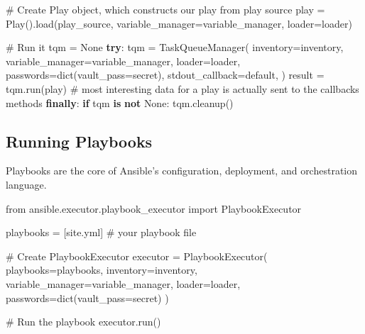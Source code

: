 \documentclass[
  letterpaper,
  DIV=11,
  numbers=noendperiod]{scrreprt}
\newenvironment{Shaded}{\begin{snugshade}}{\end{snugshade}}
\newcommand{\BuiltInTok}[1]{\textcolor[rgb]{0.00,0.23,0.31}{#1}}
\newcommand{\CommentTok}[1]{\textcolor[rgb]{0.37,0.37,0.37}{#1}}
\newcommand{\ControlFlowTok}[1]{\textcolor[rgb]{0.00,0.23,0.31}{\textbf{#1}}}
\newcommand{\ImportTok}[1]{\textcolor[rgb]{0.00,0.46,0.62}{#1}}
\newcommand{\KeywordTok}[1]{\textcolor[rgb]{0.00,0.23,0.31}{\textbf{#1}}}
\newcommand{\NormalTok}[1]{\textcolor[rgb]{0.00,0.23,0.31}{#1}}
\newcommand{\OperatorTok}[1]{\textcolor[rgb]{0.37,0.37,0.37}{#1}}
\newcommand{\StringTok}[1]{\textcolor[rgb]{0.13,0.47,0.30}{#1}}
\newcommand{\VariableTok}[1]{\textcolor[rgb]{0.07,0.07,0.07}{#1}}
\begin{document}
\begin{Shaded}
\begin{Highlighting}[]
\CommentTok{\# Create Play object, which constructs our play from play source}
\NormalTok{play }\OperatorTok{=}\NormalTok{ Play().load(play\_source, variable\_manager}\OperatorTok{=}\NormalTok{variable\_manager, loader}\OperatorTok{=}\NormalTok{loader)}

\CommentTok{\# Run it}
\NormalTok{tqm }\OperatorTok{=} \VariableTok{None}
\ControlFlowTok{try}\NormalTok{:}
\NormalTok{    tqm }\OperatorTok{=}\NormalTok{ TaskQueueManager(}
\NormalTok{              inventory}\OperatorTok{=}\NormalTok{inventory,}
\NormalTok{              variable\_manager}\OperatorTok{=}\NormalTok{variable\_manager,}
\NormalTok{              loader}\OperatorTok{=}\NormalTok{loader,}
\NormalTok{              passwords}\OperatorTok{=}\BuiltInTok{dict}\NormalTok{(vault\_pass}\OperatorTok{=}\StringTok{\textquotesingle{}secret\textquotesingle{}}\NormalTok{),}
\NormalTok{              stdout\_callback}\OperatorTok{=}\StringTok{\textquotesingle{}default\textquotesingle{}}\NormalTok{,}
\NormalTok{          )}
\NormalTok{    result }\OperatorTok{=}\NormalTok{ tqm.run(play)  }\CommentTok{\# most interesting data for a play is actually sent to the callback\textquotesingle{}s methods}
\ControlFlowTok{finally}\NormalTok{:}
    \ControlFlowTok{if}\NormalTok{ tqm }\KeywordTok{is} \KeywordTok{not} \VariableTok{None}\NormalTok{:}
\NormalTok{        tqm.cleanup()}
\end{Highlighting}
\end{Shaded}

\subsection{Running Playbooks}\label{running-playbooks}

Playbooks are the core of Ansible's configuration, deployment, and
orchestration language.

\begin{Shaded}
\begin{Highlighting}[]
\ImportTok{from}\NormalTok{ ansible.executor.playbook\_executor }\ImportTok{import}\NormalTok{ PlaybookExecutor}

\NormalTok{playbooks }\OperatorTok{=}\NormalTok{ [}\StringTok{\textquotesingle{}site.yml\textquotesingle{}}\NormalTok{]  }\CommentTok{\# your playbook file}

\CommentTok{\# Create PlaybookExecutor}
\NormalTok{executor }\OperatorTok{=}\NormalTok{ PlaybookExecutor(}
\NormalTok{    playbooks}\OperatorTok{=}\NormalTok{playbooks,}
\NormalTok{    inventory}\OperatorTok{=}\NormalTok{inventory,}
\NormalTok{    variable\_manager}\OperatorTok{=}\NormalTok{variable\_manager,}
\NormalTok{    loader}\OperatorTok{=}\NormalTok{loader,}
\NormalTok{    passwords}\OperatorTok{=}\BuiltInTok{dict}\NormalTok{(vault\_pass}\OperatorTok{=}\StringTok{\textquotesingle{}secret\textquotesingle{}}\NormalTok{)}
\NormalTok{)}

\CommentTok{\# Run the playbook}
\NormalTok{executor.run()}
\end{Highlighting}
\end{Shaded}
\end{document}
